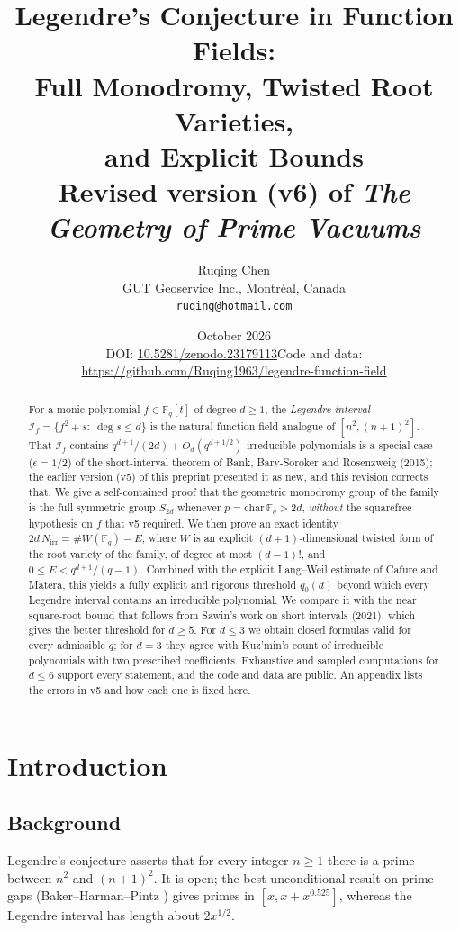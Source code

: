 \documentclass[11pt,a4paper]{article}
\title{\textbf{Legendre's Conjecture in Function Fields:\\
Full Monodromy, Twisted Root Varieties,\\ and Explicit Bounds}\\[4pt]
\large Revised version (v6) of \textit{The Geometry of Prime Vacuums}}
\author{Ruqing Chen\\[3pt]
\small GUT Geoservice Inc., Montr\'eal, Canada\\
\small \texttt{ruqing@hotmail.com}}
\date{October 2026\\[2pt]\small DOI: \href{https://doi.org/10.5281/zenodo.23179113}{10.5281/zenodo.23179113}\quad Code and data: \url{https://github.com/Ruqing1963/legendre-function-field}}
\theoremstyle{definition}
\theoremstyle{remark}
\newcommand{\Fq}{\mathbb{F}_q}
\newcommand{\Nirr}{N_{\mathrm{irr}}}
\newcommand{\cI}{\mathcal{I}}
\begin{document}
\maketitle

\begin{abstract}
For a monic polynomial $f\in\Fq[t]$ of degree $d\ge1$, the
\emph{Legendre interval} $\cI_f=\{f^2+s:\ \deg s\le d\}$ is the natural
function field analogue of $[n^2,(n+1)^2]$.
That $\cI_f$ contains $q^{d+1}/(2d)+O_d(q^{d+1/2})$ irreducible polynomials
is a special case ($\epsilon=1/2$) of the short-interval theorem of
Bank, Bary-Soroker and Rosenzweig (2015); the earlier version (v5) of
this preprint presented it as new, and this revision corrects that.
We give a self-contained proof that the geometric monodromy group of the
family is the full symmetric group $S_{2d}$ whenever $p=\mathrm{char}\,\Fq>2d$,
\emph{without} the squarefree hypothesis on $f$ that v5 required.
We then prove an exact identity
$2d\,\Nirr=\#W(\Fq)-E$, where $W$ is an explicit
$(d+1)$-dimensional twisted form of the root variety of the family,
of degree at most $(d-1)!$, and $0\le E<q^{d+1}/(q-1)$.
Combined with the explicit Lang--Weil estimate of Cafure and Matera,
this yields a fully explicit and rigorous threshold
$q_0(d)$ beyond which every Legendre interval contains an irreducible polynomial.
We compare it with the near square-root bound that follows from Sawin's work on short
intervals (2021), which gives the better threshold for $d\ge5$.
For $d\le 3$ we obtain closed formulas valid for every admissible $q$;
for $d=3$ they agree with Kuz'min's count of irreducible polynomials with
two prescribed coefficients.
Exhaustive and sampled computations for $d\le6$ support every statement,
and the code and data are public.
An appendix lists the errors in v5 and how each one is fixed here.
\end{abstract}

\tableofcontents
\bigskip

\section{Introduction}\label{sec:intro}

\subsection{Background}
Legendre's conjecture asserts that for every integer $n\ge1$ there is a
prime between $n^2$ and $(n+1)^2$. It is open; the best unconditional result
on prime gaps (Baker--Harman--Pintz \cite{BHP2001}) gives primes in
$[x,x+x^{0.525}]$, whereas the Legendre interval has length about $2x^{1/2}$.
\end{document}
